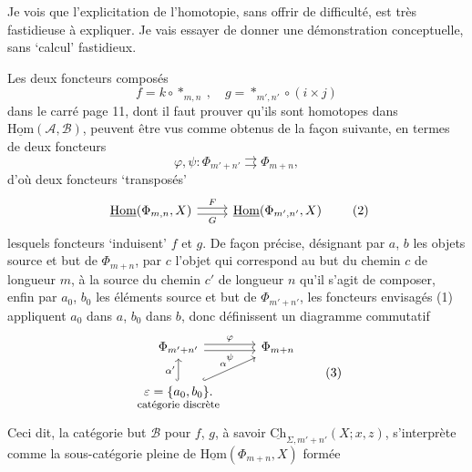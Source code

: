 \documentclass[11pt]{article}
\newcommand{\printedpage}[1]{\marginpar{\footnotesize p.~#1}}
\newcommand{\msp}[1]{\marginpar{\footnotesize [#1]}}
\newcommand{\uHom}{\underline{\mathrm{Hom}}}
\newcommand{\Ch}{\underline{\mathrm{Ch}}}
\begin{document}
Je vois que l'explicitation de l'homotopie, sans offrir de difficulté, est très fastidieuse à expliquer. Je vais essayer de donner une démonstration conceptuelle, sans `calcul' fastidieux.


\printedpage{10}

\msp{page 15}
Les deux foncteurs composés
\[
f=k\circ *_{m,n}\ ,\quad g=*_{m',n'}\circ(i\times j)
\]
dans le carré page 11, dont il faut prouver qu'ils sont homotopes dans $\uHom(\mathcal{A},\mathcal{B})$, peuvent être vus comme obtenus de la façon suivante, en termes de deux foncteurs
\[
\varphi,\psi:\Phi_{m'+n'}\rightrightarrows\Phi_{m+n}, \tag*{(1)}
\]
d'où deux foncteurs `transposés'
\[
\begin{tikzcd}
\uHom(\Phi_{m,n},X) \arrow[r,shift left,"F"] \arrow[r,shift right,"G"'] & \uHom(\Phi_{m',n'},X)
\end{tikzcd} \tag*{(2)}
\]
 lesquels foncteurs `induisent' $f$ et $g$. De façon précise, désignant par $a$, $b$ les objets source et but de $\Phi_{m+n}$, par $c$ l'objet qui correspond au but du chemin $c$ de longueur $m$, à la source du chemin $c'$ de longueur $n$ qu'il s'agit de composer, enfin par $a_0$, $b_0$ les éléments source et but de $\Phi_{m'+n'}$, les foncteurs envisagés (1) appliquent $a_0$ dans $a$, $b_0$ dans $b$, donc définissent un diagramme commutatif
\[
\begin{tikzcd}
\Phi_{m'+n'} \arrow[r,shift left,"\varphi"] \arrow[r,shift right,"\psi"'] & \Phi_{m+n} \\
\underset{\text{\footnotesize catégorie discrète}}{\varepsilon=\{a_0,b_0\}.} \arrow[u,hook,"\alpha'"] \arrow[ur,hook,"\alpha"] &
\end{tikzcd} \tag*{(3)}
\]
Ceci dit, la catégorie but $\mathcal{B}$ pour $f$, $g$, à savoir $\Ch_{\Sigma,m'+n'}(X;x,z)$, s'interprète comme la sous-catégorie pleine de $\uHom(\Phi_{m+n},X)$ formée
\end{document}
